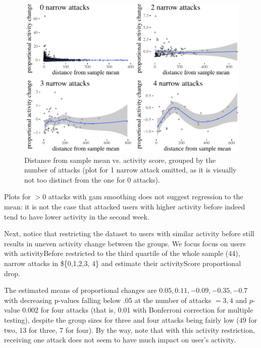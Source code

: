 \documentclass[
  10pt,
  dvipsnames]{scrartcl}
\begin{document}
\begin{figure}[H]

\begin{center}\includegraphics[width=1\linewidth]{testPatrycja_files/figure-latex/unnamed-chunk-61-1} \end{center}
\caption{Distance from sample mean vs. activity score, grouped by the number of attacks (plot for 1 narrow attack omitted, as it is visually not too distinct from the one for 0 attacks).}
\label{fig:regression2}
\end{figure}

Plots for \(>0\) attacks with gam smoothing does not suggest regression
to the mean: it is not the case that attacked users with higher activity
before indeed tend to have lower activity in the second week.

Next, notice that restricting the dataset to users with similar activity
before still results in uneven activity change between the groups. We
focus focus on users with \textsf{activityBefore} restricted to the
third quartile of the whole sample (44), narrow attacks in \$\{0,1,2,3,
4\} and estimate their \textsf{activityScore} proportional drop.

\normalsize

The estimated means of proportional changes are
\(0.05, 0.11, -0.09,-0.35, -0.7\) with decreasing p-values falling below
.05 at the number of attacks \(=3, 4\) and \(p\)-value 0.002 for four
attacks (that is, 0.01 with Bonferroni correction for multiple testing),
despite the group sizes for three and four attacks being fairly low (49
for two, 13 for three, 7 for four). By the way, note that with this
activity restriction, receiving one attack does not seem to have much
impact on user's activity.
\end{document}
